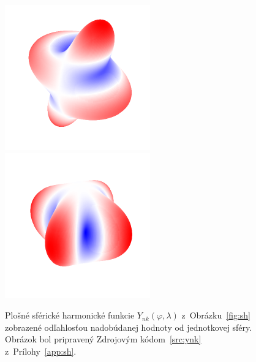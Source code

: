 \documentclass[a4paper,12pt]{book}
\begin{document}
\begin{figure}[bt]
\includegraphics{./fig-spherical-harmonic-n4-k1-3d.pdf}
\includegraphics{./fig-spherical-harmonic-n4-k4-3d.pdf}
\caption{Plošné sférické harmonické funkcie $Y_{nk}(\varphi, \lambda)$
z~Obrázku~\ref{fig:sh} zobrazené odľahlosťou nadobúdanej hodnoty od jednotkovej
sféry.  Obrázok bol pripravený Zdrojovým kódom~\ref{src:ynk}
z~Prílohy~\ref{app:sh}.}
\label{fig:sh3d}
\end{figure}
\end{document}
